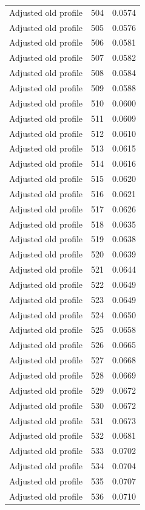 \begin{table}[htbp]
\begin{tabular}{lll}
Adjusted old profile & 504 & 0.0574 \\
Adjusted old profile & 505 & 0.0576 \\
Adjusted old profile & 506 & 0.0581 \\
Adjusted old profile & 507 & 0.0582 \\
Adjusted old profile & 508 & 0.0584 \\
Adjusted old profile & 509 & 0.0588 \\
Adjusted old profile & 510 & 0.0600 \\
Adjusted old profile & 511 & 0.0609 \\
Adjusted old profile & 512 & 0.0610 \\
Adjusted old profile & 513 & 0.0615 \\
Adjusted old profile & 514 & 0.0616 \\
Adjusted old profile & 515 & 0.0620 \\
Adjusted old profile & 516 & 0.0621 \\
Adjusted old profile & 517 & 0.0626 \\
Adjusted old profile & 518 & 0.0635 \\
Adjusted old profile & 519 & 0.0638 \\
Adjusted old profile & 520 & 0.0639 \\
Adjusted old profile & 521 & 0.0644 \\
Adjusted old profile & 522 & 0.0649 \\
Adjusted old profile & 523 & 0.0649 \\
Adjusted old profile & 524 & 0.0650 \\
Adjusted old profile & 525 & 0.0658 \\
Adjusted old profile & 526 & 0.0665 \\
Adjusted old profile & 527 & 0.0668 \\
Adjusted old profile & 528 & 0.0669 \\
Adjusted old profile & 529 & 0.0672 \\
Adjusted old profile & 530 & 0.0672 \\
Adjusted old profile & 531 & 0.0673 \\
Adjusted old profile & 532 & 0.0681 \\
Adjusted old profile & 533 & 0.0702 \\
Adjusted old profile & 534 & 0.0704 \\
Adjusted old profile & 535 & 0.0707 \\
Adjusted old profile & 536 & 0.0710 \\

\end{tabular}
\end{table}
